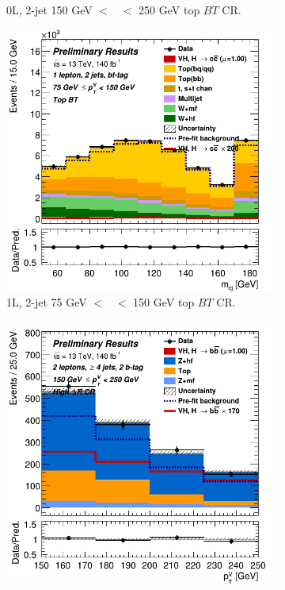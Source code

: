 \begin{figure}[h!]
\begin{subfigure}[b]{0.32\textwidth}
        \caption{0L, 2-jet 150 GeV $<$ \ptv\ $<$ 250 GeV top $BT$ CR.}
        \label{fig:posfit_0L_CR}
    \end{subfigure}
    \begin{subfigure}[b]{0.32\textwidth}
        \centering
        \includegraphics[width=\textwidth]{Images/VH/Own_fit/postfit_VHcc/Region_distmBB_BMax150_BMin75_DtopCRBC_J2_TTypebt_T1_L1_Y6051_GlobalFit_conditionnal_mu1.png}
        \caption{1L, 2-jet 75 GeV $<$ \ptv\ $<$ 150 GeV top $BT$ CR.}
        \label{fig:posfit_1L_CR}
    \end{subfigure}
    \begin{subfigure}[b]{0.32\textwidth}
        \centering
        \includegraphics[width=\textwidth]{Images/VH/Own_fit/postfit_VHbb/Region_distpTV_BMax250_BMin150_DCRHigh_J4_TTypebb_incJet1_T2_L2_Y6051_GlobalFit_conditionnal_mu1.png}

\end{subfigure}
\end{figure}
